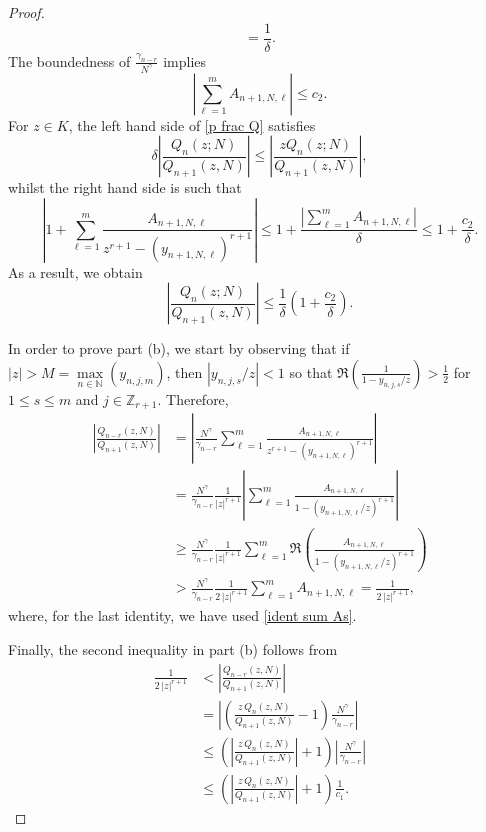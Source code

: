 \documentclass[12pt]{article}
\numberwithin{equation}{section}
\begin{document}
\begin{proof}
\[	= \frac{1}{\delta} .
\]
The boundedness of $\frac{\gamma_{n-r}}{N^\gamma}$ implies 
\[
	\left|  \sum_{\ell=1}^m A_{n+1,N,\ell} \right| \leq c_2.
\]
For $z\in K$, the left hand side of \eqref{p frac Q} satisfies 
\begin{equation}
	\delta  \left|\frac{ Q_n(z;N)}{Q_{n+1}(z,N)} \right| \leq   \left|\frac{z Q_n(z;N)}{Q_{n+1}(z,N)} \right| , 
\end{equation}
whilst the right hand side is such that 
\[
	\left|  1+\sum_{\ell=1}^m \frac{A_{n+1,N,\ell}}{z^{r+1}-\left(y_{n+1,N,\ell}\right)^{r+1}}  \right|
	\leq  1 + 	\frac{\left|  \sum_{\ell=1}^m A_{n+1,N,\ell} \right|}{\delta} 
	\leq 1+ \frac{c_2}{\delta}. 
\]
As a result, we obtain \begin{equation}\label{ratio bou}
	 \left|\frac{ Q_n(z;N)}{Q_{n+1}(z,N)} \right|
	 \leq \frac{1}{\delta} \left( 1 + \frac{c_2}{\delta}\right).  
\end{equation}

In order to prove part (b), we start by observing that if $|z|>M=\max\limits_{n\in\mathbb{N}} (y_{n,j,m})$, then $|y_{n,j,s}/z|<1$ so that $\mathfrak{R}\left( \frac{1}{1-y_{n,j,s}/z}\right)>\frac{1}{2}$ for 
$1\leq s\leq m$ and $j\in\mathbb{Z}_{r+1}$. Therefore, 
\begin{align*}
	 \left|\frac{Q_{n-r}(z,N)}{Q_{n+1}(z,N)}  \right|
	&=\left|  \frac{N^\gamma} {\gamma_{n-r}}  \sum_{\ell=1}^m \frac{A_{n+1,N,\ell}}{z^{r+1}-\left(y_{n+1,N,\ell}\right)^{r+1}} \right| \\
	&=\frac{N^\gamma} {\gamma_{n-r}} \frac{1}{|z|^{r+1}}  \left|  \sum_{\ell=1}^m \frac{A_{n+1,N,\ell}}{1-\left(y_{n+1,N,\ell}/z\right)^{r+1}} \right| \\
	&\geq \frac{N^\gamma} {\gamma_{n-r}} \frac{1}{|z|^{r+1}}   \sum_{\ell=1}^m\mathfrak{R}  \left(  \frac{A_{n+1,N,\ell}}{1-\left(y_{n+1,N,\ell}/z\right)^{r+1}} \right) \\
	 &> \frac{N^\gamma} {\gamma_{n-r}} \frac{1}{2\, |z|^{r+1}}   \sum_{\ell=1}^m  A_{n+1,N,\ell} 
	  =   \frac{1}{2\, |z|^{r+1}}, 
\end{align*}
where, for the last identity, we have used \eqref{ident sum As}. 

Finally, the second inequality in part (b) follows from 
\begin{align*}
	  \frac{1}{2\, |z|^{r+1}} &<  \left|\frac{Q_{n-r}(z,N)}{Q_{n+1}(z,N)}  \right| \\
    &=\left| \left(  \frac{z\, Q_{n}(z,N)}{Q_{n+1}(z,N)}  -1\right)  \frac{N^\gamma} {\gamma_{n-r}} \right| \\
	 &\leq \left( \left|  \frac{z\, Q_{n}(z,N)}{Q_{n+1}(z,N)}\right| +1 \right) \left| \frac{N^\gamma} {\gamma_{n-r}} \right|\\[0.2cm]
	&\leq \left( \left|  \frac{z\, Q_{n}(z,N)}{Q_{n+1}(z,N)}\right| +1 \right) \frac{1}{c_1} . 
\end{align*}
\end{proof}
\end{document}
